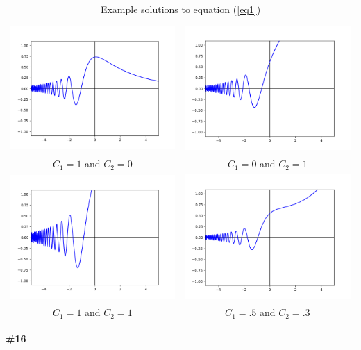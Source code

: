 \documentclass[12pt]{article}
\newcommand{\problem}[1]{\hspace{-4 ex} \large \textbf{#1}\\}
\begin{document}
	\begin{table}
		\centering
		\begin{tabular}{cc}
			\includegraphics[width=.5\textwidth]{hw3_figure_1} & \includegraphics[width=.5\textwidth]{hw3_figure_2} \\
			$C_1=1$ and $C_2=0$ & $C_1=0$ and $C_2=1$ \\
			\includegraphics[width=.5\textwidth]{hw3_figure_3} & \includegraphics[width=.5\textwidth]{hw3_figure_4} \\
			$C_1=1$ and $C_2=1$ & $C_1=.5$ and $C_2=.3$ \\
		\end{tabular}
		\caption{Example solutions to equation (\ref{eq1})}
		\label{tbl:table_of_figures}
	\end{table} 
	
\problem{\#16} 
\end{document}
